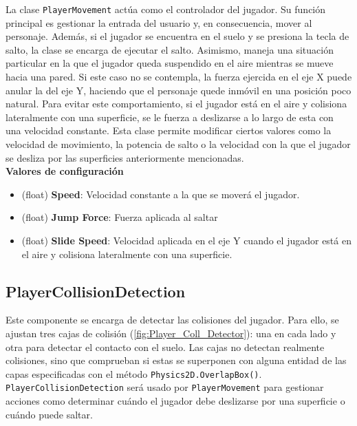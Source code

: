 La clase \texttt{PlayerMovement} actúa como el controlador del jugador. Su función principal es gestionar la entrada del usuario y, en consecuencia, mover al personaje. Además, si el jugador se encuentra en el suelo y se presiona la tecla de salto, la clase se encarga de ejecutar el salto.
Asimismo, maneja una situación particular en la que el jugador queda suspendido en el aire mientras se mueve hacia una pared. Si este caso no se contempla, la fuerza ejercida en el eje X puede anular la del eje Y, haciendo que el personaje quede inmóvil en una posición poco natural. Para evitar este comportamiento, si el jugador está en el aire y colisiona lateralmente con una superficie, se le fuerza a deslizarse a lo largo de esta con una velocidad constante.
Esta clase permite modificar ciertos valores como la velocidad de movimiento, la potencia de salto o la velocidad con la que el jugador se desliza por las superficies anteriormente mencionadas.\\

\textbf{Valores de configuración}
\begin{itemize}
	\item (float) \textbf{Speed}: Velocidad constante a la que se moverá el jugador.
	\item (float) \textbf{Jump Force}: Fuerza aplicada al saltar
	\item (float) \textbf{Slide Speed}: Velocidad aplicada en el eje Y cuando el jugador está en el aire y colisiona lateralmente con una superficie.
\end{itemize}

\subsection{PlayerCollisionDetection}

Este componente se encarga de detectar las colisiones del jugador. Para ello, se ajustan tres cajas de colisión (\autoref{fig:Player_Coll_Detector}): una en cada lado y otra para detectar el contacto con el suelo. Las cajas no detectan realmente colisiones, sino que comprueban si estas se superponen con alguna entidad de las capas especificadas con el método \texttt{Physics2D.OverlapBox()}.\\

\texttt{PlayerCollisionDetection} será usado por \texttt{PlayerMovement} para gestionar acciones como determinar cuándo el jugador debe deslizarse por una superficie o cuándo puede saltar.\\

